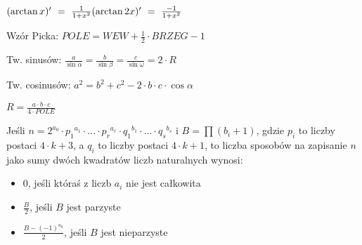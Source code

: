 $(\arctan x)'\ =\ \frac{1}{1+x^2} \hfill
	(\arctan2 x)'\ =\ \frac{-1}{1+x^2}$

Wzór Picka:
  \hfill
  $POLE = WEW + \frac{1}{2} \cdot BRZEG  - 1$

Tw. sinusów:
  \hfill
  $\frac{a}{\sin \alpha} = \frac{b}{\sin \beta} = \frac{c}{\sin \omega} = 2 \cdot R$

Tw. cosinusów:
  \hfill
  $a^2 = b^2 + c^2 - 2 \cdot b \cdot c \cdot \cos \alpha$

$R = \frac{a \cdot b \cdot c}{4 \cdot POLE}$

Jeśli $n=2^{a_0} \cdot {p_1}^{a_1} \cdot ... \cdot {p_r}^{a_r} \cdot {q_1}^{b_1} \cdot ... \cdot {q_s}^{b_s}$ i $B= \prod (b_i+1)$, gdzie $p_i$ to liczby postaci $4 \cdot k + 3$, a $q_i$ to liczby postaci $4 \cdot k + 1$, to liczba sposobów na zapisanie $n$ jako sumy dwóch kwadratów liczb naturalnych wynosi:
      \begin{itemize}
        \item 0, jeśli któraś z liczb $a_i$ nie jest całkowita
        \item $\frac{B}{2}$, jeśli $B$ jest parzyste
        \item $\frac{B-(-1)^{a_0}}{2}$, jeśli $B$ jest nieparzyste
      \end{itemize}

